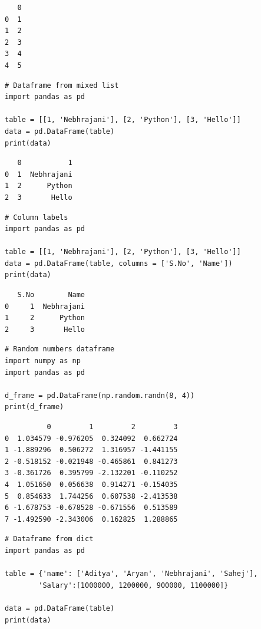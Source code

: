 \documentclass[11pt]{article}
\begin{document}
\begin{verbatim}
   0
0  1
1  2
2  3
3  4
4  5
\end{verbatim}


\begin{verbatim}
# Dataframe from mixed list
import pandas as pd

table = [[1, 'Nebhrajani'], [2, 'Python'], [3, 'Hello']]
data = pd.DataFrame(table)
print(data)
\end{verbatim}

\begin{verbatim}
   0           1
0  1  Nebhrajani
1  2      Python
2  3       Hello
\end{verbatim}


\begin{verbatim}
# Column labels
import pandas as pd

table = [[1, 'Nebhrajani'], [2, 'Python'], [3, 'Hello']]
data = pd.DataFrame(table, columns = ['S.No', 'Name'])
print(data)
\end{verbatim}

\begin{verbatim}
   S.No        Name
0     1  Nebhrajani
1     2      Python
2     3       Hello
\end{verbatim}


\begin{verbatim}
# Random numbers dataframe
import numpy as np
import pandas as pd

d_frame = pd.DataFrame(np.random.randn(8, 4))
print(d_frame)
\end{verbatim}

\begin{verbatim}
          0         1         2         3
0  1.034579 -0.976205  0.324092  0.662724
1 -1.889296  0.506272  1.316957 -1.441155
2 -0.518152 -0.021948 -0.465861  0.841273
3 -0.361726  0.395799 -2.132201 -0.110252
4  1.051650  0.056638  0.914271 -0.154035
5  0.854633  1.744256  0.607538 -2.413538
6 -1.678753 -0.678528 -0.671556  0.513589
7 -1.492590 -2.343006  0.162825  1.288865
\end{verbatim}


\begin{verbatim}
# Dataframe from dict
import pandas as pd

table = {'name': ['Aditya', 'Aryan', 'Nebhrajani', 'Sahej'],
        'Salary':[1000000, 1200000, 900000, 1100000]}

data = pd.DataFrame(table)
print(data)
\end{verbatim}
\end{document}

